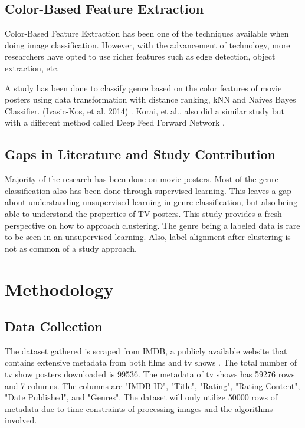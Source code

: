 \documentclass[conference]{IEEEtran}
\begin{document}
\subsection{Color-Based Feature Extraction}

Color-Based Feature Extraction has been one of the techniques available when doing image classification. However, with the advancement of technology, more researchers have opted to use richer features such as edge detection, object extraction, etc. 

A study has been done to classify genre based on the color features of movie posters using data transformation with distance ranking, kNN and Naives Bayes Classifier. (Ivasic-Kos, et al. 2014) \cite{b5}. Korai, et al., also did a similar study but with a different method called Deep Feed Forward Network \cite{b6}.

\subsection{Gaps in Literature and Study Contribution}

Majority of the research has been done on movie posters. Most of the genre classification also has been done through supervised learning. This leaves a gap about understanding unsupervised learning in genre classification, but also being able to understand the properties of TV posters. This study provides a fresh perspective on how to approach clustering. The genre being a labeled data is rare to be seen in an unsupervised learning. Also, label alignment after clustering is not as common of a study approach.

\section{Methodology}

\subsection{Data Collection}
The dataset gathered is scraped from IMDB, a publicly available website that contains extensive metadata from both films and tv shows \cite{b8}. The total number of tv show posters downloaded is 99536. The metadata of tv shows has 59276 rows and 7 columns. The columns are "IMDB ID", "Title", "Rating", "Rating Content", "Date Published", and "Genres". The dataset will only utilize 50000 rows of metadata due to time constraints of processing images and the algorithms involved.
\end{document}
